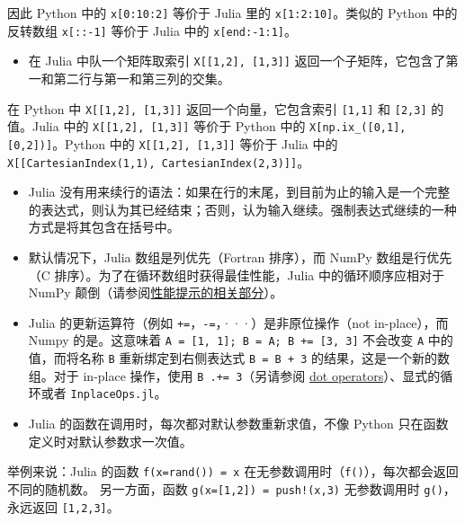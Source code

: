 因此 Python 中的 \texttt{x[0:10:2]} 等价于 Julia 里的 \texttt{x[1:2:10]}。类似的 Python 中的反转数组 \texttt{x[::-1]} 等价于 Julia 中的 \texttt{x[end:-1:1]}。



\begin{itemize}
\item 在 Julia 中队一个矩阵取索引 \texttt{X[[1,2], [1,3]]} 返回一个子矩阵，它包含了第一和第二行与第一和第三列的交集。

\end{itemize}


在 Python 中 \texttt{X[[1,2], [1,3]]} 返回一个向量，它包含索引 \texttt{[1,1]} 和 \texttt{[2,3]} 的值。Julia 中的 \texttt{X[[1,2], [1,3]]} 等价于 Python 中的 \texttt{X[np.ix\_([0,1],[0,2])]}。Python 中的 \texttt{X[[1,2], [1,3]]} 等价于 Julia 中的 \texttt{X[[CartesianIndex(1,1), CartesianIndex(2,3)]]}。



\begin{itemize}
\item Julia 没有用来续行的语法：如果在行的末尾，到目前为止的输入是一个完整的表达式，则认为其已经结束；否则，认为输入继续。强制表达式继续的一种方式是将其包含在括号中。


\item 默认情况下，Julia 数组是列优先（Fortran 排序），而 NumPy 数组是行优先（C 排序）。为了在循环数组时获得最佳性能，Julia 中的循环顺序应相对于 NumPy 颠倒（请参阅\hyperlink{11239800376478112527}{性能提示的相关部分}）。


\item Julia 的更新运算符（例如 \texttt{+=}，\texttt{-=}，···）是非原位操作（not in-place），而 Numpy 的是。这意味着 \texttt{A = [1, 1]; B = A; B += [3, 3]} 不会改变 \texttt{A} 中的值，而将名称 \texttt{B} 重新绑定到右侧表达式 \texttt{B = B + 3} 的结果，这是一个新的数组。对于 in-place 操作，使用 \texttt{B .+= 3}（另请参阅 \hyperlink{15967322336376951940}{dot operators}）、显式的循环或者 \texttt{InplaceOps.jl}。


\item Julia 的函数在调用时，每次都对默认参数重新求值，不像 Python 只在函数定义时对默认参数求一次值。

\end{itemize}


举例来说：Julia 的函数 \texttt{f(x=rand()) = x} 在无参数调用时（\texttt{f()}），每次都会返回不同的随机数。 另一方面，函数 \texttt{g(x=[1,2]) = push!(x,3)} 无参数调用时 \texttt{g()}，永远返回 \texttt{[1,2,3]}。



